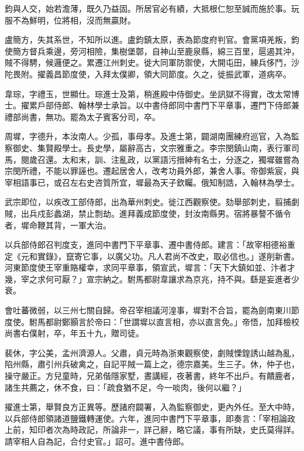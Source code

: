 \begin{pinyinscope}
 鈞與人交，始若澹薄，既久乃益固。所居官必有績，大抵根仁恕至誠而施於事。玩服不為鮮明，位將相，沒而無贏財。



 盧簡方，失其系世，不知所以進。盧鈞鎮太原，表為節度府判官。會黨項羌叛，鈞使簡方督兵乘邊，旁河相險，集樹堡鄣，自神山至鹿泉縣，綿三百里，扈遏其沖，賊不得騁，候邏便之。累遷江州刺史。徙大同軍防禦使，大開屯田，練兵侈鬥，沙陀畏附。擢義昌節度使，入拜太僕卿，領大同節度。久之，徙振武軍，道病卒。



 韋琮，字禮玉，世顯仕。琮進士及第，稍進殿中侍御史。坐訊獄不得實，改太常博士。擢累戶部侍郎、翰林學士承旨。以中書侍郎同中書門下平章事，遷門下侍郎兼禮部尚書，無功。罷為太子賓客分司，卒。



 周墀，字德升，本汝南人。少孤，事母孝。及進士第，闢湖南團練府巡官，入為監察御史、集賢殿學士。長史學，屬辭高古，文宗雅重之。李宗閔鎮山南，表行軍司馬，閱歲召還。太和末，訓、注亂政，以黨語污搢紳有名士，分逐之，獨墀雖嘗為宗閔所禮，不能以罪誣也。遷起居舍人，改考功員外郎，兼舍人事。帝御紫宸，與宰相語事已，或召左右史咨質所宜，墀最為天子欽矚。俄知制誥，入翰林為學士。



 武宗即位，以疾改工部侍郎，出為華州刺史。徙江西觀察使。劾舉部刺史，翦捕劇賊，出兵戍彭蠡湖，禁止剽劫。進拜義成節度使，封汝南縣男。宿將暴謷不循令者，墀命鞭其背，一軍大治。



 以兵部侍郎召判度支，進同中書門下平章事、遷中書侍郎。建言：「故宰相德裕重定《元和實錄》，竄寄它事，以廣父功。凡人君尚不改史，取必信也。」遂削新書。河東節度使王宰重賂權幸，求同平章事，領宣武，墀言：「天下大鎮如並、汴者才幾，宰之求何可厭？」宣宗納之。駙馬都尉韋讓求為京兆，持不與。繇是妄進者少衰。



 會吐蕃微弱，以三州七關自歸。帝召宰相議河湟事，墀對不合旨，罷為劍南東川節度使。駙馬都尉鄭顥言於帝曰：「世謂墀以直言相，亦以直言免。」帝悟，加拜檢校尚書右僕射，卒，年五十九，贈司徒。



 裴休，字公美，孟州濟源人。父肅，貞元時為浙東觀察使，劇賊慄鍠誘山越為亂，陷州縣，肅引州兵破禽之，自記平賊一篇上之，德宗嘉美。生三子。休，仲子也，操守嚴正。方兒童時，兄弟偕隱家墅，晝講經，夜著書，終年不出戶。有饋鹿者，諸生共薦之，休不食，曰：「疏食猶不足，今一啖肉，後何以繼？」



 擢進士第，舉賢良方正異等。歷諸府闢署，入為監察御史，更內外任。至大中時，以兵部侍郎領諸道鹽鐵轉運使。六年，進同中書門下平章事，即奏言：「宰相論政上前，知印者次為時政記，所論非一，詳己辭，略它議，事有所缺，史氏莫得詳。請宰相人自為記，合付史官。」詔可。進中書侍郎。




\end{pinyinscope}
